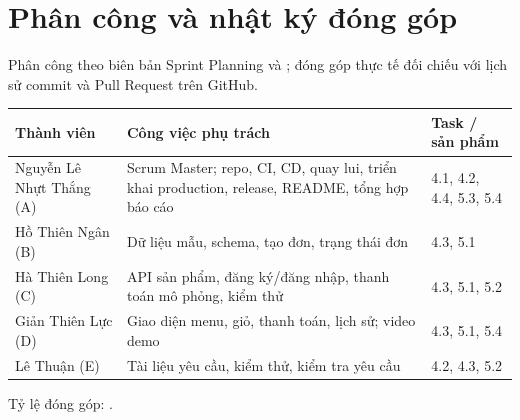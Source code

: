 \chapter{Phân công và nhật ký đóng góp}\label{app:phancong}
Phân công theo biên bản Sprint Planning và ; đóng góp thực tế đối chiếu với lịch sử commit và Pull Request trên GitHub.
\begin{longtable}{@{}p{3.2cm}p{6.2cm}p{3.6cm}@{}}
\toprule
\textbf{Thành viên} & \textbf{Công việc phụ trách} & \textbf{Task / sản phẩm} \\ \midrule \endhead
Nguyễn Lê Nhựt Thắng (A) & Scrum Master; repo, CI, CD, quay lui, triển khai production, release, README, tổng hợp báo cáo & 4.1, 4.2, 4.4, 5.3, 5.4 \\
Hồ Thiên Ngân (B) & Dữ liệu mẫu, schema, tạo đơn, trạng thái đơn & 4.3, 5.1 \\
Hà Thiên Long (C) & API sản phẩm, đăng ký/đăng nhập, thanh toán mô phỏng, kiểm thử & 4.3, 5.1, 5.2 \\
Giản Thiên Lực (D) & Giao diện menu, giỏ, thanh toán, lịch sử; video demo & 4.3, 5.1, 5.4 \\
Lê Thuận (E) & Tài liệu yêu cầu, kiểm thử, kiểm tra yêu cầu & 4.2, 4.3, 5.2 \\
\bottomrule
\end{longtable}
Tỷ lệ đóng góp: .
